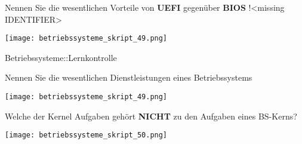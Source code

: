\documentclass{article}
\begin{document}
\begin{tcolorbox}[colback=white!10!white,colframe=lightgray!75!black,
  savelowerto=\jobname_ex.tex]

\begin{center}
Nennen Sie die wesentlichen Vorteile von 
\textbf{UEFI
} gegenüber 
\textbf{BIOS
}!<missing IDENTIFIER>

\end{center}

\tcblower

\justifying
\texttt{[image: betriebssysteme\_skript\_49.png]}

\end{tcolorbox}
\begin{tcolorbox}[colback=white!10!white,colframe=lightgray!75!black,
  savelowerto=\jobname_ex.tex]

\begin{center}
Betriebssysteme::Lernkontrolle

\end{center}

\tcblower

\justifying

\end{tcolorbox}
\begin{tcolorbox}[colback=white!10!white,colframe=lightgray!75!black,
  savelowerto=\jobname_ex.tex]

\begin{center}
Nennen Sie die wesentlichen Dienstleistungen eines Betriebssystems

\end{center}

\tcblower

\justifying
\texttt{[image: betriebssysteme\_skript\_49.png]}

\end{tcolorbox}
\begin{tcolorbox}[colback=white!10!white,colframe=lightgray!75!black,
  savelowerto=\jobname_ex.tex]

\begin{center}
Welche der Kernel Aufgaben gehört 
\textbf{NICHT
} zu den Aufgaben eines BS-Kerns?

\end{center}

\tcblower

\justifying
\texttt{[image: betriebssysteme\_skript\_50.png]}

\end{tcolorbox}
\end{document}

